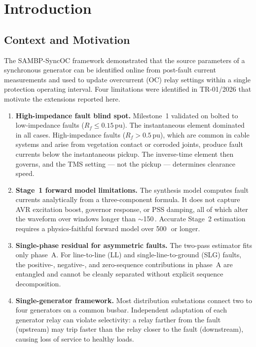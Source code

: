 \documentclass[12pt,a4paper]{article}
\theoremstyle{definition}
\theoremstyle{plain}
\newcommand{\pu}{\,\text{pu}}
\newcommand{\mss}{\,\text{ms}}
\begin{document}
\newpage

\section{Introduction}
\label{sec:intro}

\subsection{Context and Motivation}
\label{sec:intro:context}

The SAMBP-SyncOC framework \citep{TR01_2026} demonstrated that the source
parameters of a synchronous generator can be identified online from
post-fault current measurements and used to update overcurrent (OC) relay
settings within a single protection operating interval.  Four limitations
were identified in TR-01/2026 that motivate the extensions reported here.

\begin{enumerate}
  \item \textbf{High-impedance fault blind spot.}  Milestone~1 validated on
        bolted to low-impedance faults ($R_f \leq 0.15\pu$).  The
        instantaneous element dominated in all cases.  High-impedance faults
        ($R_f > 0.5\pu$), which are common in cable systems and arise from
        vegetation contact or corroded joints, produce fault currents below
        the instantaneous pickup.  The inverse-time element then governs, and
        the TMS setting --- not the pickup --- determines clearance speed.

  \item \textbf{Stage~1 forward model limitations.}  The synthesis model
        computes fault currents analytically from a three-component formula.
        It does not capture AVR excitation boost, governor response, or PSS
        damping, all of which alter the waveform over windows longer than
        $\sim$150\mss.  Accurate Stage~2 estimation requires a physics-faithful
        forward model over 500\mss\ or longer.

  \item \textbf{Single-phase residual for asymmetric faults.}  The two-pass
        estimator fits only phase~A.  For line-to-line (LL) and
        single-line-to-ground (SLG) faults, the positive-, negative-, and
        zero-sequence contributions in phase~A are entangled and cannot be
        cleanly separated without explicit sequence decomposition.

  \item \textbf{Single-generator framework.}  Most distribution substations
        connect two to four generators on a common busbar.  Independent
        adaptation of each generator relay can violate selectivity: a relay
        farther from the fault (upstream) may trip faster than the relay
        closer to the fault (downstream), causing loss of service to healthy
        loads.
\end{enumerate}
\end{document}
